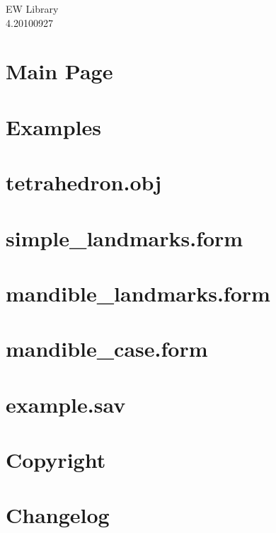\documentclass[letterpaper]{article}
\begin{document}
\begin{titlepage}
\vspace*{7cm}
\begin{center}
{\Large EW Library \\[1ex]\large 4.20100927 }\\
\end{center}
\end{titlepage}
\tableofcontents
{}
\section{Main Page}
\label{index}\hypertarget{index}{}
\section{Examples}
\label{examples}
\hypertarget{examples}{}

\section{tetrahedron.obj}
\label{tetrahedron.obj}
\hypertarget{tetrahedron.obj}{}

\section{simple\_\-landmarks.form}
\label{simple_landmarks.form}
\hypertarget{simple_landmarks.form}{}

\section{mandible\_\-landmarks.form}
\label{mandible_template.form}
\hypertarget{mandible_template.form}{}

\section{mandible\_\-case.form}
\label{mandible_case.form}
\hypertarget{mandible_case.form}{}

\section{example.sav}
\label{example.sav}
\hypertarget{example.sav}{}

\section{Copyright}
\label{copyright}
\hypertarget{copyright}{}

\section{Changelog}
\label{changelog}
\hypertarget{changelog}{}

\end{document}
